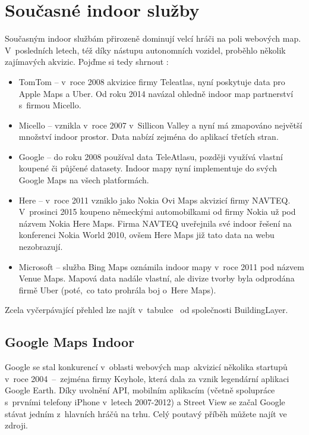                     



\section{Současné indoor služby}\label{souux10dasnuxe9-indoor-sluux17eby}

Současným indoor službám přirozeně dominují velcí hráči na poli webových map. V~posledních letech, též díky nástupu autonomních vozidel, proběhlo několik zajímavých akvizic. Pojďme si tedy shrnout :

\begin{itemize}

\item
  TomTom -- v~roce 2008 akvizice firmy Teleatlas, nyní poskytuje data pro Apple Maps a Uber. Od roku 2014 navázal ohledně indoor map partnerství s~firmou Micello.\cite{zdroj6}\cite{zdroj6b}
\item
  Micello -- vznikla v~roce 2007 v~Sillicon Valley a nyní má zmapováno největší množství indoor prostor. Data nabízí zejména do aplikací třetích stran.\cite{zdroj7}
\item
  Google -- do roku 2008 používal data TeleAtlasu, později využívá vlastní koupené či půjčené datasety\cite{zdroj8}. Indoor mapy nyní implementuje do svých Google Maps na všech platformách.
\item
  Here -- v~roce 2011 vzniklo jako Nokia Ovi Maps akvizicí firmy NAVTEQ. V~prosinci 2015 koupeno německými automobilkami od firmy Nokia už pod názvem Nokia Here Maps\cite{zdroj9}\cite{zdroj9b}. Firma NAVTEQ uveřejnila své indoor řešení na konferenci Nokia World 2010\cite{zdroj10}, ovšem Here Maps již tato data na webu nezobrazují.
\item
  Microsoft -- služba Bing Maps oznámila indoor mapy v~roce 2011 pod názvem Venue Maps\cite{zdroj11}. Mapová data nadále vlastní, ale divize tvorby byla odprodána firmě Uber (poté,~co tato prohrála boj o~Here Maps).\cite{zdroj12}
\end{itemize}

Zcela vyčerpávající přehled lze najít v~tabulce \cite{zdroj13}~od společnosti BuildingLayer.

\subsection{Google Maps Indoor}\label{google-maps-indoor}

Google se stal konkurencí v~oblasti webových map~akvizicí několika startupů v~roce 2004~--~zejména firmy Keyhole, která dala za vznik legendární aplikaci Google Earth. Díky uvolnění API, mobilním aplikacím (včetně spolupráce s~prvními telefony iPhone v~letech 2007-2012) a Street View se začal Google stávat jedním z~hlavních hráčů na trhu. Celý poutavý příběh můžete najít ve zdroji.\cite{zdroj14}

